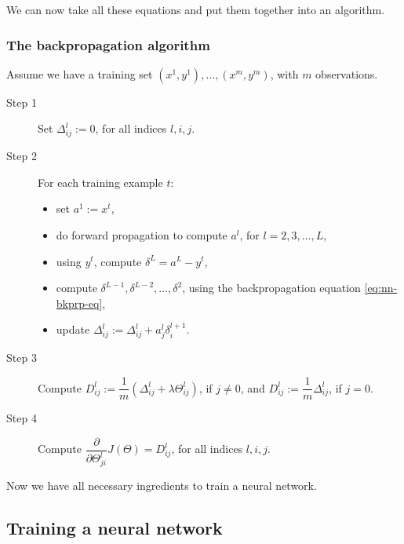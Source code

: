 \documentclass[a4paper,11pt]{report}
\begin{document}
We can now take all these equations and put them together into an algorithm.

\subsubsection*{The backpropagation algorithm}

Assume we have a training set ${(x^1,y^1), \ldots, (x^m,y^m)}$, with $m$ observations.
\begin{description}
\item[Step 1]{Set $\Delta^{l}_{ij}:= 0$, for all indices $l, i, j$.}

\item[Step 2] {For each training example $t$:

\begin{itemize}
\item set $a^{1} := x^{t}$,
\item do forward propagation to compute $a^{l}$, for $l=2,3,\ldots,L$,
\item using $y^{t}$, compute $\delta^{L} = a^{L} - y^{t}$,
\item compute $\delta^{L-1}, \delta^{L-2},\ldots, \delta^{2}$, using the backpropagation equation \eqref{eq:nn-bkprp-eq},
\item update $\Delta^{l}_{ij} := \Delta^{l}_{ij} + a_j^{l} \delta_i^{l+1}$.
\end{itemize}
}
\item[Step 3]{Compute $D^l_{ij} := \dfrac{1}{m}\left(\Delta^l_{ij} + \lambda\Theta^l_{ij} \right)$, if $j\neq 0$, and $D^{l}_{ij} := \dfrac{1}{m}\Delta^{l}_{ij}$, if $j = 0$.}

\item[Step 4]{Compute $\dfrac{\partial}{\partial\Theta^l_{ji}}J(\Theta) = D^l_{ij}$, for all indices $l, i, j$.}
\end{description}

Now we have all necessary ingredients to train a neural network.

\subsection*{Training a neural network}
\end{document}
